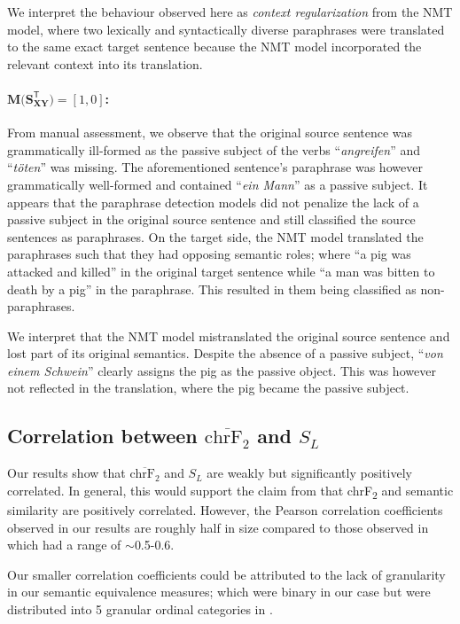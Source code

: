 \documentclass[11pt,a4paper]{article}
\begin{document}
We interpret the behaviour observed here as \textit{context regularization} from
the NMT model, where two lexically and syntactically diverse paraphrases were
translated to the same exact target sentence because the NMT model incorporated
the relevant context into its translation.

\paragraph{$\mathbf{M(S_{XY}^{\mathsf{T}}}) = [1,0]$:} From manual assessment,
we observe that the original source sentence was grammatically ill-formed as the
passive subject of the verbs ``\textit{angreifen}'' and ``\textit{töten}'' was
missing. The aforementioned sentence's paraphrase was however grammatically
well-formed and contained ``\textit{ein Mann}'' as a passive subject. It appears
that the paraphrase detection models did not penalize the lack of a passive
subject in the original source sentence and still classified the source
sentences as paraphrases. On the target side, the NMT model translated the
paraphrases such that they had opposing semantic roles; where ``a pig was
attacked and killed'' in the original target sentence while ``a man was bitten
to death by a pig'' in the paraphrase. This resulted in them being classified as
non-paraphrases.

We interpret that the NMT model mistranslated the original source sentence and
lost part of its original semantics. Despite the absence of a passive subject,
``\textit{von einem Schwein}'' clearly assigns the pig as the passive object.
This was however not reflected in the translation, where the pig became the
passive subject.

\subsection{Correlation between $\overline{\text{chrF}_2}$ and $S_L$}

Our results show that $\overline{\text{chrF}_2}$ and $S_L$ are weakly but
significantly positively correlated. In general, this would support the claim
from \citet{michel2019evaluation} that chrF\textsubscript{2} and semantic
similarity are positively correlated. However, the Pearson correlation
coefficients observed in our results are roughly half in size compared to those
observed in \citet{michel2019evaluation} which had a range of $\sim$0.5-0.6.

Our smaller correlation coefficients could be attributed to the lack of
granularity in our semantic equivalence measures; which were binary in our case
but were distributed into 5 granular ordinal categories in
\citet{michel2019evaluation}.
\end{document}
